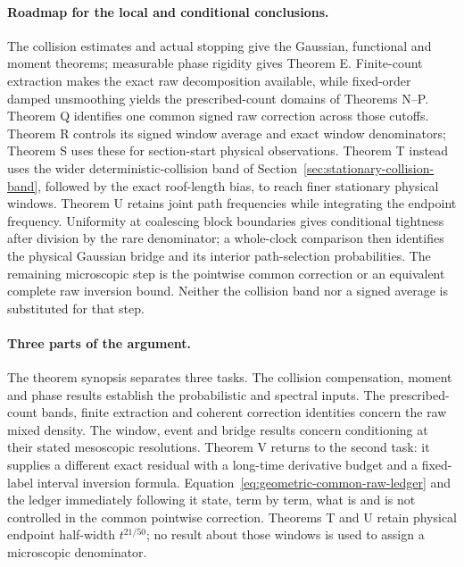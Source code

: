 \documentclass[11pt,reqno]{amsart}
\numberwithin{equation}{section}
\theoremstyle{definition}\newtheorem{definition}[theorem]{Definition}
\theoremstyle{remark}\newtheorem{remark}[theorem]{Remark}
\begin{document}
\paragraph{Roadmap for the local and conditional conclusions.}
The collision estimates and actual stopping give the Gaussian,
functional and moment theorems; measurable phase rigidity gives
Theorem E. Finite-count extraction makes the exact raw decomposition
available, while fixed-order damped unsmoothing yields the
prescribed-count domains of Theorems N--P. Theorem Q identifies one
common signed raw correction across those cutoffs. Theorem R controls
its signed window average and exact window denominators; Theorem S
uses these for section-start physical observations. Theorem T instead
uses the wider deterministic-collision band of
Section~\ref{sec:stationary-collision-band}, followed by the exact
roof-length bias, to reach finer stationary physical windows.
Theorem U retains joint path frequencies while integrating the endpoint
frequency. Uniformity at coalescing block boundaries gives conditional
tightness after division by the rare denominator; a whole-clock
comparison then identifies the physical Gaussian bridge and its
interior path-selection probabilities.
The remaining microscopic step is the pointwise common correction
or an equivalent complete raw inversion bound. Neither the collision
band nor a signed average is substituted for that step.

\paragraph{Three parts of the argument.}
The theorem synopsis separates three tasks. The collision compensation,
moment and phase results establish the probabilistic and spectral inputs.
The prescribed-count bands, finite extraction and coherent correction
identities concern the raw mixed density. The window, event and bridge
results concern conditioning at their stated mesoscopic resolutions.
Theorem V returns to the second task: it supplies a different exact
residual with a long-time derivative budget and a fixed-label interval
inversion formula. Equation~\eqref{eq:geometric-common-raw-ledger} and
the ledger immediately following it state, term by term, what is and
is not controlled in the common pointwise correction. Theorems T and U
retain physical endpoint half-width $t^{21/50}$; no result about those
windows is used to assign a microscopic denominator.
\end{document}

